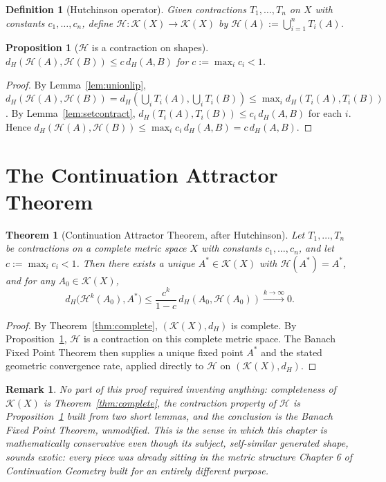 \documentclass[11pt]{report}
\newtheorem{proposition}{Proposition}[chapter]
\newtheorem{theorem}{Theorem}[chapter]
\newtheorem{definition}{Definition}[chapter]
\newtheorem{remark}{Remark}[chapter]
\begin{document}
\begin{definition}[Hutchinson operator]
Given contractions $T_1, \dots, T_n$ on $X$ with constants
$c_1, \dots, c_n$, define $\mathcal{H} : \mathcal{K}(X) \to \mathcal{K}(X)$
by $\mathcal{H}(A) := \bigcup_{i=1}^n T_i(A)$.
\end{definition}

\begin{proposition}[$\mathcal{H}$ is a contraction on shapes]
\label{prop:hcontract}
$d_H(\mathcal{H}(A), \mathcal{H}(B)) \leq c\, d_H(A,B)$ for
$c := \max_i c_i < 1$.
\end{proposition}
\begin{proof}
By Lemma~\ref{lem:unionlip},
$d_H(\mathcal{H}(A), \mathcal{H}(B)) = d_H\left(\bigcup_i T_i(A), \bigcup_i T_i(B)\right)
\leq \max_i d_H(T_i(A), T_i(B))$. By Lemma~\ref{lem:setcontract},
$d_H(T_i(A), T_i(B)) \leq c_i\, d_H(A,B)$ for each $i$. Hence
$d_H(\mathcal{H}(A), \mathcal{H}(B)) \leq \max_i c_i\, d_H(A,B) = c\, d_H(A,B)$.
\end{proof}

\section*{The Continuation Attractor Theorem}

\begin{theorem}[Continuation Attractor Theorem, after Hutchinson]
\label{thm:attractor}
Let $T_1, \dots, T_n$ be contractions on a complete metric space $X$
with constants $c_1, \dots, c_n$, and let $c := \max_i c_i < 1$. Then
there exists a unique $A^\ast \in \mathcal{K}(X)$ with
$\mathcal{H}(A^\ast) = A^\ast$, and for any $A_0 \in \mathcal{K}(X)$,
\[
d_H\big(\mathcal{H}^k(A_0), A^\ast\big) \leq \frac{c^k}{1-c}\, d_H(A_0, \mathcal{H}(A_0)) \xrightarrow{k \to \infty} 0.
\]
\end{theorem}
\begin{proof}
By Theorem~\ref{thm:complete}, $(\mathcal{K}(X), d_H)$ is complete. By
Proposition~\ref{prop:hcontract}, $\mathcal{H}$ is a contraction on
this complete metric space. The Banach Fixed Point Theorem
\cite{banach1922} then
supplies a unique fixed point $A^\ast$ and the stated geometric
convergence rate, applied directly to $\mathcal{H}$ on
$(\mathcal{K}(X), d_H)$.
\end{proof}

\begin{remark}
No part of this proof required inventing anything: completeness of
$\mathcal{K}(X)$ is Theorem~\ref{thm:complete}, the contraction
property of $\mathcal{H}$ is Proposition~\ref{prop:hcontract} built
from two short lemmas, and the conclusion is the Banach Fixed Point
Theorem, unmodified. This is the sense in which this chapter is
mathematically conservative even though its subject, self-similar
generated shape, sounds exotic: every piece was already sitting in
the metric structure Chapter 6 of \emph{Continuation Geometry}
built for an entirely different purpose.
\end{remark}
\end{document}
